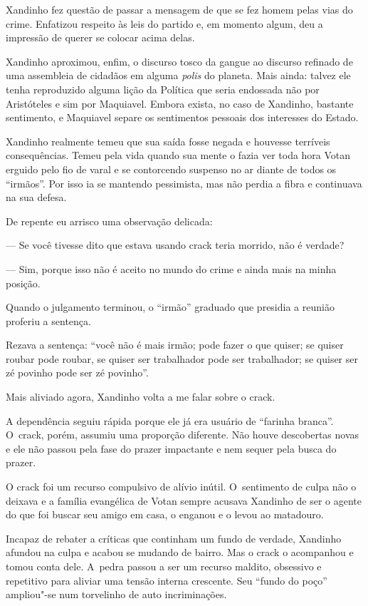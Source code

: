 Xandinho fez questão de passar a mensagem de que se fez homem pelas vias
do crime. Enfatizou respeito às leis do partido e, em momento algum, deu
a impressão de querer se colocar acima delas.

Xandinho aproximou, enfim, o discurso tosco da gangue ao discurso
refinado de uma assembleia de cidadãos em alguma \emph{polis} do
planeta. Mais ainda: talvez ele tenha reproduzido alguma lição da
Política que seria endossada não por Aristóteles e sim por Maquiavel.
Embora exista, no caso de Xandinho, bastante sentimento, e Maquiavel
separe os sentimentos pessoais dos interesses do Estado.

\asterisc

Xandinho realmente temeu que sua saída fosse negada e houvesse terríveis
consequências. Temeu pela vida quando sua mente o fazia ver toda hora
Votan erguido pelo fio de varal e se contorcendo suspenso no ar diante
de todos os ``irmãos''. Por isso ia se mantendo pessimista, mas não
perdia a fibra e continuava na sua defesa.

De repente eu arrisco uma observação delicada:

— Se você tivesse dito que estava usando crack teria morrido, não é
verdade?

— Sim, porque isso não é aceito no mundo do crime e ainda mais na minha
posição.

\asterisc{}

Quando o julgamento terminou, o ``irmão'' graduado que presidia a
reunião proferiu a sentença.

Rezava a sentença: ``você não é mais irmão; pode fazer o que quiser; se
quiser roubar pode roubar, se quiser ser trabalhador pode ser
trabalhador; se quiser ser zé povinho pode ser zé povinho''.

\asterisc{}

Mais aliviado agora, Xandinho volta a me falar sobre o crack.

A dependência seguiu rápida porque ele já era usuário de ``farinha
branca''. O~crack, porém, assumiu uma proporção diferente. Não houve
descobertas novas e ele não passou pela fase do prazer impactante e nem
sequer pela busca do prazer.

O crack foi um recurso compulsivo de alívio inútil. O~sentimento de
culpa não o deixava e a família evangélica de Votan sempre acusava
Xandinho de ser o agente do  que foi buscar seu amigo em casa, o
enganou e o levou ao matadouro.

Incapaz de rebater a críticas que continham um fundo de verdade,
Xandinho afundou na culpa e acabou se mudando de bairro. Mas o crack o
acompanhou e tomou conta dele. A~pedra passou a ser um recurso maldito,
obsessivo e repetitivo para aliviar uma tensão interna crescente. Seu
``fundo do poço'' ampliou"-se num torvelinho de auto incriminações.

